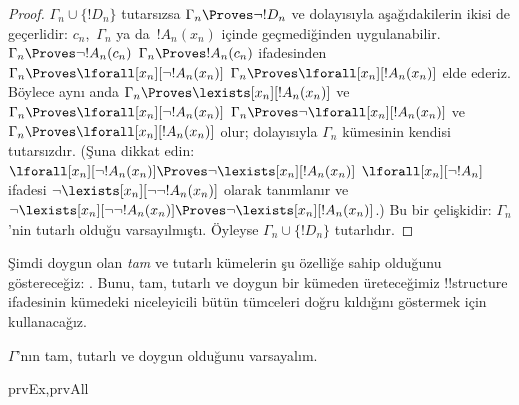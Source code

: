 \documentclass[../../../include/open-logic-section]{subfiles}
\begin{document}
\begin{proof}
$\Gamma_n\cup\{!D_n\}$ tutarsızsa $\Gamma_n\Proves\lnot !D_n$ ve
dolayısıyla aşağıdakilerin ikisi de geçerlidir:
$c_n$,~$\Gamma_n$ ya da~$!A_n(x_n)$ içinde geçmediğinden
uygulanabilir.
{$\Gamma_n\Proves\lnot !A_n(c_n)$}
{$\Gamma_n\Proves !A_n(c_n)$}
ifadesinden
{$\Gamma_n\Proves\lforall[x_n][\lnot !A_n(x_n)]$}
{$\Gamma_n\Proves\lforall[x_n][!A_n(x_n)]$}
elde ederiz. Böylece aynı anda
{$\Gamma_n\Proves\lexists[x_n][!A_n(x_n)]$ ve
$\Gamma_n\Proves\lforall[x_n][\lnot !A_n(x_n)]$}
{$\Gamma_n\Proves\lnot\lforall[x_n][!A_n(x_n)]$ ve
$\Gamma_n\Proves\lforall[x_n][!A_n(x_n)]$}
olur; dolayısıyla $\Gamma_n$ kümesinin kendisi tutarsızdır.
{(Şuna dikkat edin:
{$\lforall[x_n][\lnot !A_n(x_n)]\Proves
  \lnot\lexists[x_n][!A_n(x_n)]$}
{$\lforall[x_n][\lnot !A_n]$ ifadesi
  $\lnot\lexists[x_n][\lnot\lnot !A_n(x_n)]$ olarak tanımlanır ve
  $\lnot\lexists[x_n][\lnot\lnot !A_n(x_n)]\Proves
  \lnot\lexists[x_n][!A_n(x_n)]$}.)}{}
Bu bir çelişkidir: $\Gamma_n$'nin tutarlı olduğu varsayılmıştı.
Öyleyse $\Gamma_n\cup\{!D_n\}$ tutarlıdır.
\end{proof}

\begin{explain}
Şimdi doygun olan \emph{tam} ve tutarlı kümelerin şu özelliğe sahip
olduğunu göstereceğiz: 
. Bunu, tam,
tutarlı ve doygun bir kümeden üreteceğimiz !!{structure} ifadesinin
kümedeki niceleyicili bütün tümceleri doğru kıldığını göstermek için
kullanacağız.
\end{explain}

\begin{prop}
$\Gamma$'nın tam, tutarlı ve doygun olduğunu varsayalım.
\begin{tagenumerate}{prvEx,prvAll}
\end{tagenumerate}
\end{prop}
\end{document}
